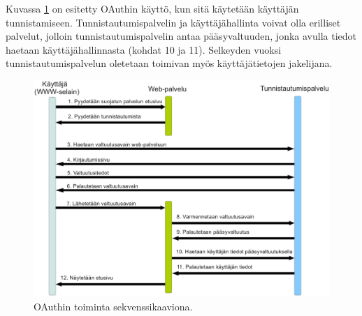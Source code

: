 Kuvassa \ref{oauth} on esitetty OAuthin käyttö, kun sitä käytetään käyttäjän tunnistamiseen. Tunnistautumispalvelin ja käyttäjähallinta voivat olla erilliset palvelut, jolloin tunnistautumispalvelin antaa pääsyvaltuuden, jonka avulla tiedot haetaan käyttäjähallinnasta (kohdat 10 ja 11). Selkeyden vuoksi tunnistautumispalvelun oletetaan toimivan myös käyttäjätietojen jakelijana.

\begin{figure}[ht]
\centering
\includegraphics[width=\textwidth]{teknologiat/protokollat/oauth.eps}
\caption{OAuthin toiminta sekvenssikaaviona.}%
\label{oauth}
\end{figure}